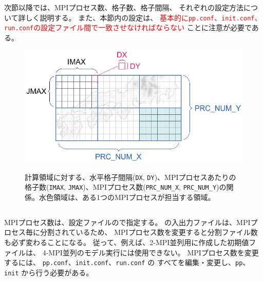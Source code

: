 次節以降では、MPIプロセス数、格子数、格子間隔、
それぞれの設定方法について詳しく説明する。
また、本節内の設定は、
\textcolor{red}{基本的に\texttt{pp.conf}、\texttt{init.conf}、\texttt{run.conf}の設定ファイル間で一致させなければならない}
ことに注意が必要である。


\begin{figure}[h]
\begin{center}
  \includegraphics[width=0.8\hsize]{./figure/domain_decomposition.eps}\\
  \caption{計算領域に対する、水平格子間隔(\texttt{DX}, \texttt{DY})、MPIプロセスあたりの格子数(\texttt{IMAX}, \texttt{JMAX})、MPIプロセス数(\texttt{PRC\_NUM\_X}, \texttt{PRC\_NUM\_Y})の関係。水色領域は、ある1つのMPIプロセスが担当する領域。}
  \label{fig:domain}
\end{center}
\end{figure}

\subsection{\SubsecMPIProcess} \label{subsec:relation_dom_reso2}

MPIプロセス数は、設定ファイルので指定する。
\scalerm の入出力ファイルは、MPIプロセス毎に分割されているため、
MPIプロセス数を変更すると分割ファイル数も必ず変わることになる。
従って、例えば、2-MPI並列用に作成した初期値ファイルは、
4-MPI並列のモデル実行には使用できない。
MPIプロセス数を変更するには、
\verb|pp.conf|、\verb|init.conf|、\verb|run.conf| の
すべてを編集・変更し、\verb|pp|、\verb|init| から行う必要がある。\\

\\


